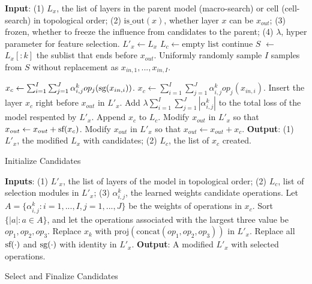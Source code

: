 \begin{algorithm}[t]
\begin{algorithmic}[1]
\STATE \textbf{Input}: 
(1) $L_x$, the list of layers in the parent model (macro-search) or cell (cell-search) in topological order;
(2) $\text{is\_out}(x)$, whether layer $x$ can be $x_{out}$;
(3) frozen, whether to freeze the influence from candidates to the parent;
(4) $\lambda$, hyper parameter for feature selection.
\STATE $L'_x \leftarrow L_x$
\STATE $L_c \leftarrow \text{empty list}$
        \STATE continue
    \ENDIF
    \STATE $S$ $\leftarrow$ $L_x[:k]$ the sublist that ends before $x_{out}$.
    \STATE Uniformly randomly sample $I$ samples from $S$ without replacement as $x_{in,1}, ..., x_{in,I}$.

        \STATE $x_c \leftarrow \sum _{i=1}^I \sum _{j=1}^J  \alpha^k_{i,j}op_j(\textrm{sg} (x_{in,i}))$.
    \ELSE
        \STATE $x_c \leftarrow \sum _{i=1}^I \sum _{j=1}^J  \alpha^k_{i,j}op_j(x_{in,i})$.
    \ENDIF
\STATE Insert the layer $x_c$ right before $x_{out}$ in $L'_x$.
\STATE Add $\lambda \sum _{i=1}^I \sum _{j=1}^J |\alpha^k_{i,j}|$ to the total loss of the model respented by $L'_x$.
\STATE Append $x_c$ to $L_c$.
    \STATE Modify $x_{out}$ in $L'_x$ so that $x_{out} \leftarrow x_{out} + \textrm{sf} (x_c)$.
\ELSE
    \STATE Modify $x_{out}$ in $L'_x$ so that $x_{out} \leftarrow x_{out} + x_c$.
\ENDIF
\ENDFOR
\STATE \textbf{Output}: (1) $L'_x$, the modified $L_x$ with candidates; 
(2) $L_c$, the list of $x_c$ created.
\end{algorithmic}
\caption{Initialize Candidates}
\label{alg:candidate_init}
\end{algorithm}

\begin{algorithm}[t]
\begin{algorithmic}[1]
\STATE \textbf{Inputs}: (1) $L'_x$, the list of layers of the model in topological order;
(2) $L_c$, list of selection modules in $L'_x$;
(3) $\alpha^k_{i,j}$, the learned weights candidate operations. 
    \STATE Let $A = \{\alpha^{k}_{i,j}: i = 1,..., I, j = 1,..., J\}$  be the weights of operations in $x_c$.
    \STATE Sort $\{ |a| : a \in A \}$, and let the operations associated with the largest three value be $op_1, op_2, op_3$.
    \STATE Replace $x_k$ with $\text{proj}(\text{concat}(op_1, op_2, op_3))$ in $L'_x$.
\ENDFOR
\STATE Replace all $\textrm{sf} (\cdot)$ and $\textrm{sg} (\cdot)$ with identity in $L'_x$.
\STATE \textbf{Output}: A modified $L'_x$ with selected operations.
\end{algorithmic}
\caption{Select and Finalize Candidates}
\label{alg:candidate_select}
\end{algorithm}

